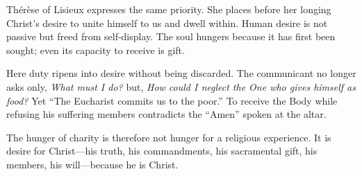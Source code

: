 Thérèse of Lisieux expresses the same priority. She places before her longing Christ's desire to unite himself to us and dwell within. Human desire is not passive but freed from self-display. The soul hungers because it has first been sought; even its capacity to receive is gift.

Here duty ripens into desire without being discarded. The communicant no longer asks only, \emph{What must I do?} but, \emph{How could I neglect the One who gives himself as food?} Yet ``The Eucharist commits us to the poor.'' To receive the Body while refusing his suffering members contradicts the ``Amen'' spoken at the altar.

The hunger of charity is therefore not hunger for a religious experience. It is desire for Christ---his truth, his commandments, his sacramental gift, his members, his will---because he is Christ.
